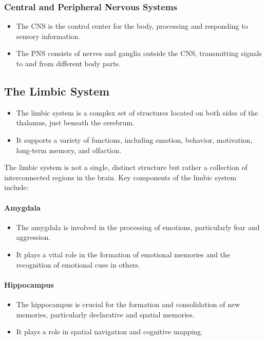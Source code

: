 \documentclass{article}
\begin{document}
\subsubsection{Central and Peripheral Nervous Systems}
\begin{itemize}
    \item The CNS is the control center for the body, processing and responding to sensory information.
    \item The PNS consists of nerves and ganglia outside the CNS, transmitting signals to and from different body parts.
\end{itemize}

\subsection{The Limbic System}
\begin{itemize}
    \item The limbic system is a complex set of structures located on both sides of the thalamus, just beneath the cerebrum.
    \item It supports a variety of functions, including emotion, behavior, motivation, long-term memory, and olfaction.
\end{itemize}

The limbic system is not a single, distinct structure but rather a collection of interconnected regions in the brain. Key components of the limbic system include:

\paragraph{Amygdala}

\begin{itemize}
  \item The amygdala is involved in the processing of emotions, particularly fear and aggression.
  \item It plays a vital role in the formation of emotional memories and the recognition of emotional cues in others.
\end{itemize}

\paragraph{Hippocampus}

\begin{itemize}
  \item The hippocampus is crucial for the formation and consolidation of new memories, particularly declarative and spatial memories.
  \item It plays a role in spatial navigation and cognitive mapping.
\end{itemize}
\end{document}
